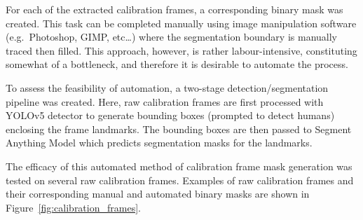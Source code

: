 For each of the extracted calibration frames, a corresponding binary mask was created.
This task can be completed manually using image manipulation software (e.g.\ Photoshop,
GIMP, etc\ldots) where the segmentation boundary is manually traced then filled.
This approach, however, is rather labour-intensive, constituting somewhat
of a bottleneck, and therefore it is desirable to automate the process.

To assess the feasibility of automation, a two-stage detection/segmentation pipeline was
created.
Here, raw calibration frames are first processed with YOLOv5 detector\cite{YOLO} to
generate bounding boxes (prompted to detect humans) enclosing the frame landmarks.
The bounding boxes are then passed to Segment Anything Model which predicts segmentation
masks for the landmarks.

The efficacy of this automated method of calibration frame mask generation was tested on
several raw calibration frames.
Examples of raw calibration frames and their corresponding manual and automated binary masks
are shown in Figure~\ref{fig:calibration_frames}.

\vspace{5mm}

